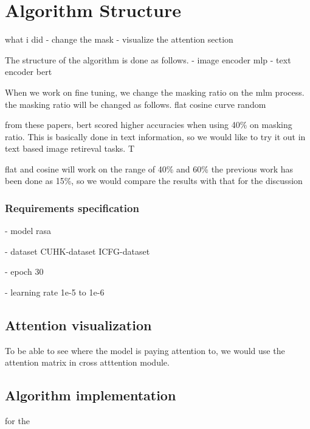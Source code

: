 \chapter{Algorithm Structure}

what i did 
- change the mask 
- visualize the attention section

The structure of the algorithm is done as follows. 
- image encoder
  mlp 
- text encoder
  bert 

When we work on fine tuning, we change the masking ratio on the mlm process. 
the masking ratio will be changed as follows.
flat 
cosine curve 
random 

from these papers, bert scored higher accuracies when using 40\% on masking ratio. This is basically done in text information, 
so we would like to try it out in text based image retireval tasks. T

flat and cosine will work on the range of 40\% and 60\% 
the previous work has been done as 15\%, so we would compare the results with that for the discussion 

\subsection{Requirements specification}

- model
rasa

- dataset 
CUHK-dataset
ICFG-dataset

- epoch
30

- learning rate 
1e-5 to 1e-6

\section{Attention visualization}
To be able to see where the model is paying attention to, we would use the attention matrix in cross atttention module.



\section{Algorithm implementation}

for the 